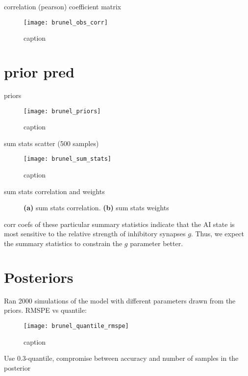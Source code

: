 correlation (pearson) coefficient matrix

\begin{figure}[H]
    \centering
    \texttt{[image: brunel\_obs\_corr]}
    \caption{caption}
    \label{fig:fig1}
\end{figure}

\section{prior pred}

priors

\begin{figure}[H]
    \centering
    \texttt{[image: brunel\_priors]}
    \caption{caption}
    \label{fig:fig1}
\end{figure}

sum stats scatter (500 samples)

\begin{figure}[H]
    \centering
    \texttt{[image: brunel\_sum\_stats]}
    \caption{caption}
    \label{fig:fig1}
\end{figure}


sum stats correlation and weights

\begin{figure}[H]
\centering
{}
\qquad
{}
\caption{\textbf{(a)} sum stats correlation. \textbf{(b)} sum stats weights
}
\label{fig:fig1}
\end{figure}

corr coefs of these particular summary statistics indicate that the AI state is most sensitive to the relative strength of inhibitory synapses $g$. Thus, we expect the summary statistics to constrain the $g$ parameter better.


\section{Posteriors} 

Ran 2000 simulations of the model with different parameters drawn from the priors. RMSPE vs quantile: 

\begin{figure}[H]
    \centering
    \texttt{[image: brunel\_quantile\_rmspe]}
    \caption{caption}
    \label{fig:fig1}
\end{figure}

Use 0.3-quantile, compromise between accuracy and number of samples in the posterior

